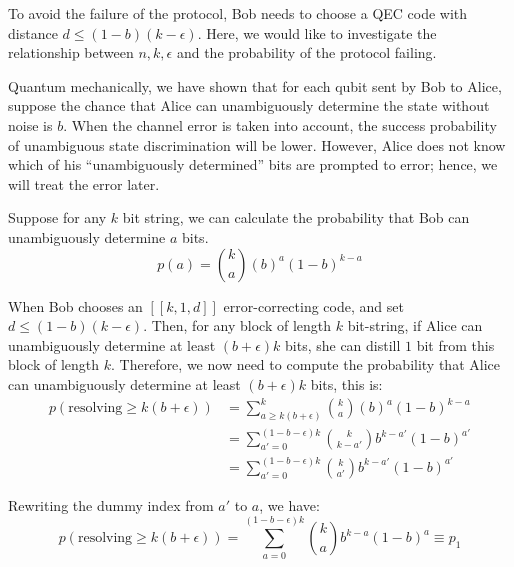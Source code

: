 \documentclass[%
 reprint,
superscriptaddress,
 amsmath,amssymb,
 aps,
]{revtex4-2}
\begin{document}
To avoid the failure of the protocol, Bob needs to choose a QEC code with distance $d\le (1-b)(k-\epsilon)$. Here, we would like to investigate the relationship between $n, k, \epsilon$ and the probability of the protocol failing.

Quantum mechanically, we have shown that for each qubit sent by Bob to Alice, suppose the chance that Alice can unambiguously determine the state without noise is $b$. When the channel error is taken into account, the success probability of unambiguous state discrimination will be lower. However, Alice does not know which of his ``unambiguously determined'' bits are prompted to error; hence, we will treat the error later.


Suppose for any $k$ bit string, we can calculate the probability that Bob can unambiguously determine $a$ bits.
\begin{equation}
    p(a) = \binom{k}{a} \left(b\right)^a\left(1-b\right)^{k-a}
\end{equation}

When Bob chooses an $[[k, 1, d]]$ error-correcting code, and set $d \le(1-b)(k-\epsilon)$. Then, for any block of length $k$ bit-string, if Alice can unambiguously determine at least $(b+\epsilon)k$ bits, she can distill $1$ bit from this block of length $k$. Therefore, we now need to compute the probability that Alice can unambiguously determine at least $\left(b+\epsilon\right)k$ bits, this is:
\begin{equation}
\begin{split}
    p(\text{resolving}\ge k(b+\epsilon)) &= \sum_{a\ge k(b+\epsilon)}^k \binom{k}{a}\left(b\right)^a\left(1-b\right)^{k-a}\\
    &=\sum_{a'=0}^{(1-b-\epsilon)k}\binom{k}{k-a'}b^{k-a'}(1-b)^{a'}\\
    &=\sum_{a'=0}^{(1-b-\epsilon)k}\binom{k}{a'}b^{k-a'}(1-b)^{a'}
\end{split}
\end{equation}

Rewriting the dummy index from $a'$ to $a$, we have:
\begin{equation}
    p(\text{resolving}\ge k(b+\epsilon)) = \sum_{a=0}^{(1-b-\epsilon)k}\binom{k}{a}b^{k-a}(1-b)^{a}\equiv p_1
    \label{eq:p_each_block}
\end{equation}
\end{document}
